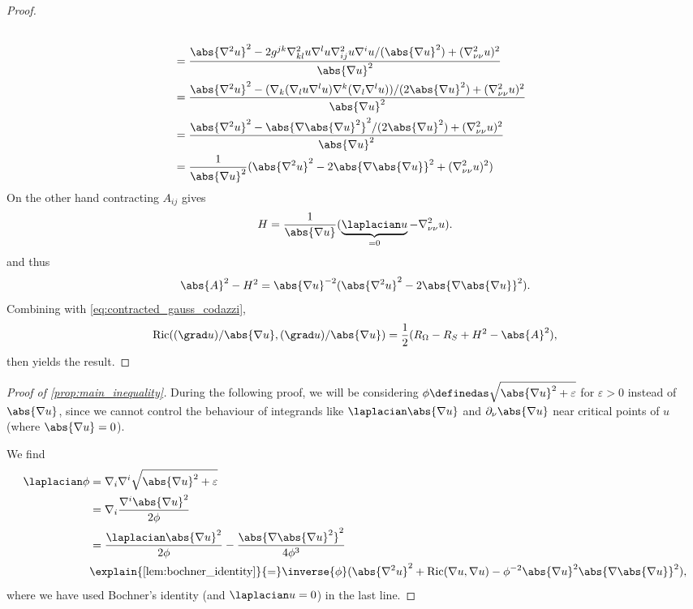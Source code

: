 \documentclass[titlepage,numbers=noenddot,oneside,%
cleardoublepage=empty,paper=a4,fontsize=11pt,%
english,%
]{scrartcl}
\newcommand{\Ricci}{\mathrm{Ric}} %
\begin{document}
{\begin{proof}
\begin{equation*}
\begin{aligned}[t]
\begin{aligned}[t]
            \end{aligned}\\
            &=\frac{\abs{\nabla^2 u}^2-2g^{jk}\nabla^2_{kl}u\nabla^l u\nabla^2_{ij}u \nabla^i{u}/(\abs{\nabla u}^2)+(\nabla^2_{\nu\nu}u)^2}{\abs{\nabla u}^2}\\
            &=\frac{\abs{\nabla^2 u}^2-(\nabla_k(\nabla_l u \nabla^l u)\nabla^k(\nabla_l \nabla^l u))/(2\abs{\nabla u}^2) +(\nabla^2_{\nu\nu}u)^2}{\abs{\nabla u}^2}\\
            &=\frac{\abs{\nabla^2 u}^2-\abs{\nabla\abs{\nabla u}^2}^2/(2\abs{\nabla u}^2)+(\nabla^2_{\nu\nu}u)^2}{\abs{\nabla u}^2}\\
            &=\frac{1}{\abs{\nabla u}^2}(\abs{\nabla^2 u}^2-2\abs{\nabla \abs{\nabla u}}^2+(\nabla^2_{\nu\nu}u)^2)
        \end{aligned}
    \end{equation*}
    On the other hand contracting \( A_{ij} \) gives
    \begin{equation*}
        H=\frac{1}{\abs{\nabla u}}(\underbrace{\laplacian u}_{=0}-\nabla^2_{\nu \nu} u).
    \end{equation*}
    and thus
    \begin{equation*}
        \abs{A}^2-H^2=\abs{\nabla u}^{-2}(\abs{\nabla^2 u}^2-2\abs{\nabla\abs{\nabla u}}^2).
    \end{equation*}
    Combining with \cref{eq:contracted_gauss_codazzi},
    \begin{equation*}
        \Ricci((\grad u)/\abs{\nabla u},(\grad u)/\abs{\nabla u})=\frac{1}{2}(R_\Omega-R_S+H^2-\abs{A}^2),
    \end{equation*} 
    then yields the result.
\end{proof}
\begin{proof}[Proof of \cref{prop:main_inequality}]
    During the following proof, we will be considering \( \phi\definedas \sqrt{\abs{\nabla u}^2+\varepsilon} \) for \( \varepsilon>0 \) instead of \( \abs{\nabla u} \), since we cannot control the behaviour of integrands like \( \laplacian \abs{\nabla u} \) and \( \partial_\nu \abs{\nabla u} \) near critical points of \( u \) (where \( \abs{\nabla u}=0 \)).

    We find
    \begin{equation}\label{eq:main_inequality_applied_bochner}
        \begin{aligned}[b]
            \laplacian \phi&=\nabla_i \nabla^i \sqrt{\abs{\nabla u}^2+\varepsilon}\\
            &=\nabla_i \frac{\nabla^i \abs{\nabla u}^2}{2\phi}\\
            &=\frac{\laplacian \abs{\nabla u}^2}{2\phi}-\frac{\abs{\nabla\abs{\nabla u}^2}^2}{4\phi^3}\\
            &\explain{\text{\cref{lem:bochner_identity}}}{=}\inverse{\phi}(\abs{\nabla^2 u}^2+\Ricci(\nabla u,\nabla u)-\phi^{-2}\abs{\nabla u}^2\abs{\nabla \abs{\nabla u}}^2),
        \end{aligned}
    \end{equation}
    where we have used Bochner's identity (and \( \laplacian u=0 \)) in the last line.


\end{proof}}
\end{document}
